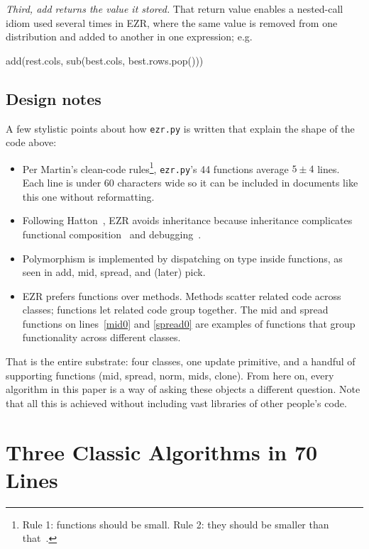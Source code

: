 \documentclass[AMA,STIX2COL]{WileyNJDv5}
\newcommand{\IT}{{\sffamily EZR}}
\begin{document}
{\textit{Third, \textsf{add} returns the value it stored.} That
return value enables a nested-call idiom used several times in
\IT{}, where the same value is removed from one distribution
and added to another in one expression; e.g.
\begin{repl}
add(rest.cols, sub(best.cols, best.rows.pop()))
\end{repl}

\subsection{Design notes}

A few stylistic points about how \texttt{ezr.py} is written
that explain the shape of the code above:
\begin{itemize}
\item Per Martin's clean-code rules\footnote{Rule 1: functions
should be small. Rule 2: they should be smaller than
that~\cite{martin2009clean}.}, \texttt{ezr.py}'s 44 functions
average $5\pm4$ lines. Each line is under 60 characters wide
so it can be included in documents like this one without
reformatting.
\item Following Hatton~\cite{Hatton:1998}, \IT{} avoids
inheritance because inheritance complicates functional
composition~\cite{GoF:1995} and debugging~\cite{Hatton:1998}.
\item Polymorphism is implemented by dispatching on type
inside functions, as seen in \textsf{add}, \textsf{mid},
\textsf{spread}, and (later) \textsf{pick}.
\item \IT{} prefers functions over methods. Methods scatter
related code across classes; functions let related code group
together. The \textsf{mid} and \textsf{spread} functions on
lines~\ref{mid0} and \ref{spread0} are examples of functions
that group functionality across different classes.
\end{itemize}

That is the entire substrate: four classes, one update
primitive, and a handful of supporting functions
(\textsf{mid}, \textsf{spread}, \textsf{norm}, \textsf{mids},
\textsf{clone}). From here on, every algorithm in this paper
is a way of asking these objects a different question. Note
that all this is achieved without including vast libraries
of other people's code.




\section{Three Classic Algorithms in 70 Lines}\label{sec:famous}

}
\end{document}
